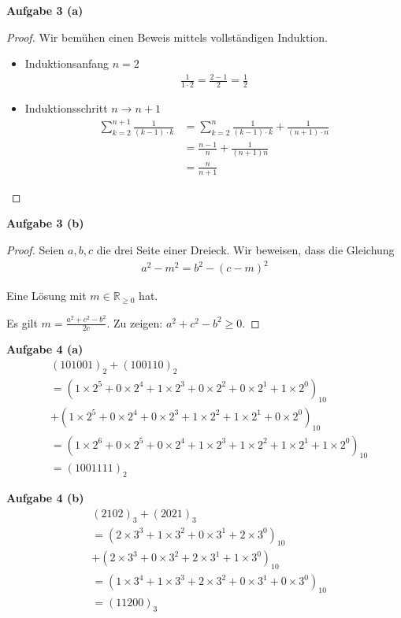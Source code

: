 \documentclass[12pt]{extarticle}
\begin{document}
\textbf{Aufgabe 3 (a)}
\begin{proof}
  Wir bemühen einen Beweis mittels vollständigen Induktion.

  \begin{itemize}
  \item Induktionsanfang \(n=2\)
\begin{align*}
\frac{1}{1 \cdot 2} = \frac{2-1}{2} = \frac{1}{2}
\end{align*}
\item Induktionsschritt \(n \rightarrow n+1\)
\begin{align*}
\sum_{k=2}^{n+1}{\frac{1}{(k-1)\cdot
  k}}&=\sum_{k=2}^n{\frac{1}{(k-1)\cdot k}}+\frac{1}{(n+1)\cdot n}\\
     &= \frac{n-1}{n}+\frac{1}{(n+1)n}\tag*{Induktionsvoraussetzung}\\
  &=\frac{n}{n+1}
\end{align*}
  \end{itemize}
\end{proof}


\textbf{Aufgabe 3 (b)}
\begin{proof}

  Seien \(a, b, c\) die drei Seite einer Dreieck.  Wir beweisen, dass
  die Gleichung
\begin{align*}
a^2-m^2=b^2-(c-m)^2
\end{align*}

Eine Lösung mit \(m \in \mathbb{R}_{\geq 0}\) hat.

Es gilt \(m=\frac{a^2+c^2-b^2}{2c}\).  Zu zeigen: \(a^2+c^2-b^2 \geq 0\).
\end{proof}
\newpage
\textbf{Aufgabe 4 (a)}
\begin{align*}
  &(101001)_2+(100110)_2 \\
  &= (1 \times 2^5+0 \times 2^4+1 \times 2^3+0 \times 2^2+0 \times
    2^1+1 \times 2^0)_{10} \\
  &+ (1 \times 2^5+0 \times 2^4+0 \times 2^3+1 \times 2^2+1 \times
    2^1+0 \times 2^0)_{10} \\
  &= (1 \times 2^6+0 \times 2^5+0 \times 2^4+1 \times 2^3+1 \times 2^2+1 \times
    2^1+1 \times 2^0)_{10} \\
  &= (1001111)_2
\end{align*}

\textbf{Aufgabe 4 (b)}
\begin{align*}
  &(2102)_3+(2021)_3\\
  &=(2 \times 3^3 + 1 \times 3^2 + 0 \times 3^1 + 2 \times 3^0)_{10}\\
  &+(2 \times 3^3 + 0 \times 3^2 + 2 \times 3^1 + 1 \times 3^0)_{10}\\
  &=(1 \times 3^4 +1 \times 3^3 + 2 \times 3^2 + 0 \times 3^1 + 0
    \times 3^0)_{10}\\
  &=(11200)_3
\end{align*}
\end{document}
